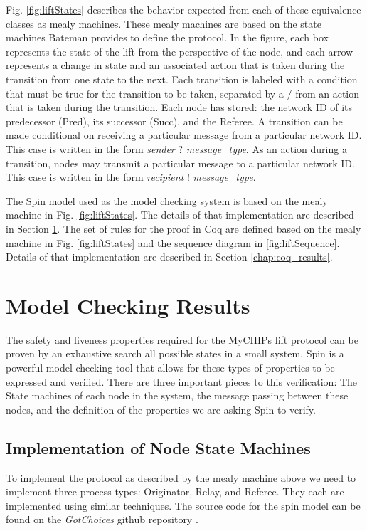 \documentclass[runningheads]{llncs}
\begin{document}
Fig. \ref{fig:liftStates} describes the behavior expected from each of these equivalence classes as mealy machines.
These mealy machines are based on the state machines Bateman provides to define the protocol. \cite{bateman_state_machines} 
In the figure, each box represents the state of the lift from the perspective of the node, and each arrow represents a change in state and an associated action that is taken during the transition from one state to the next. Each transition is labeled with a condition that must be true for the transition to be taken, separated by a $/$ from an action that is taken during the transition. Each node has stored: the network ID of its predecessor (Pred), its successor (Succ), and the Referee. A transition can be made conditional on receiving a particular message from a particular network ID. This case is written in the form \emph{sender} $?$ \emph{message\_type}. As an action during a transition, nodes may transmit a particular message to a particular network ID. This case is written in the form \emph{recipient} $!$ \emph{message\_type}. 

The Spin model used as the model checking system is based on the mealy machine in Fig. \ref{fig:liftStates}. The details of that implementation are described in Section \ref{chap:model_checking_results}. The set of rules for the proof in Coq are defined based on the mealy machine in Fig. \ref{fig:liftStates} and the sequence diagram in \ref{fig:liftSequence}. Details of that implementation are described in Section \ref{chap:coq_results}.


\section{Model Checking Results} \label{chap:model_checking_results}
The safety and liveness properties required for the MyCHIPs lift protocol can be proven by an exhaustive search all possible states in a small system. Spin is a powerful model-checking tool that allows for these types of properties to be expressed and verified. There are three important pieces to this verification: The State machines of each node in the system, the message passing between these nodes, and the definition of the properties we are asking Spin to verify. 

\subsection{Implementation of Node State Machines} 
To implement the protocol as described by the mealy machine above we need to implement three process types: Originator, Relay, and Referee. They each are implemented using similar techniques. The source code for the spin model can be found on the \emph{GotChoices} github repository \cite{bateman_myCHIPs}. 
\end{document}
